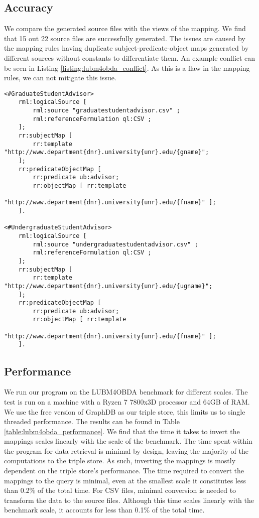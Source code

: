 \subsection{Accuracy}
We compare the generated source files with the views of the mapping. We find that 15 out 22 source files are successfully generated. The issues are caused by the mapping rules having duplicate subject-predicate-object maps generated by different sources without constants to differentiate them. An example conflict can be seen in Listing \ref{listing:lubm4obda_conflict}. As this is a flaw in the mapping rules, we can not mitigate this issue.

\begin{lstlisting}[caption={Example of a duplicate mapping pattern in the LUBM4OBDA benchmark}, captionpos=b, label={listing:lubm4obda_conflict}, basicstyle=\small, frame=single]
<#GraduateStudentAdvisor>
    rml:logicalSource [ 
        rml:source "graduatestudentadvisor.csv" ;
        rml:referenceFormulation ql:CSV ;
    ];
    rr:subjectMap [
        rr:template "http://www.department{dnr}.university{unr}.edu/{gname}";
    ];
    rr:predicateObjectMap [
        rr:predicate ub:advisor;
        rr:objectMap [ rr:template 
                "http://www.department{dnr}.university{unr}.edu/{fname}" ];
    ].

<#UndergraduateStudentAdvisor>
    rml:logicalSource [ 
        rml:source "undergraduatestudentadvisor.csv" ;
        rml:referenceFormulation ql:CSV ;
    ];
    rr:subjectMap [
        rr:template "http://www.department{dnr}.university{unr}.edu/{ugname}";
    ];
    rr:predicateObjectMap [
        rr:predicate ub:advisor;
        rr:objectMap [ rr:template 
                "http://www.department{dnr}.university{unr}.edu/{fname}" ];
    ].
\end{lstlisting}

\subsection{Performance}
We run our program on the LUBM4OBDA benchmark for different scales. The test is run on a machine with a Ryzen 7 7800x3D processor and 64GB of RAM. We use the free version of GraphDB as our triple store, this limits us to single threaded performance. The results can be found in Table \ref{table:lubm4obda_performance}. We find that the time it takes to invert the mappings scales linearly with the scale of the benchmark. The time spent within the program for data retrieval is minimal by design, leaving the majority of the computations to the triple store. As such, inverting the mappings is mostly dependent on the triple store's performance. The time required to convert the mappings to the query is minimal, even at the smallest scale it constitutes less than 0.2\% of the total time. For CSV files, minimal conversion is needed to transform the data to the source files. Although this time scales linearly with the benchmark scale, it accounts for less than 0.1\% of the total time.

